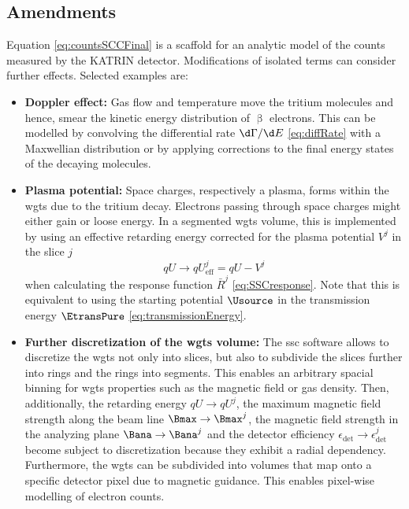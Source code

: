 \subsection{Amendments}
Equation \eqref{eq:countsSCCFinal} is a scaffold for an analytic model of the counts measured by the KATRIN detector. Modifications of isolated terms can consider further effects. Selected examples are:
\begin{itemize}
    \item \textbf{Doppler effect:} Gas flow and temperature move the tritium molecules and hence, smear the kinetic energy distribution of $\upbeta$ electrons. This can be modelled by convolving the differential rate $\d \Gamma / \d E$ \eqref{eq:diffRate} with a Maxwellian distribution or by applying corrections to the final energy states of the decaying molecules.
    \item \textbf{Plasma potential:} Space charges, respectively a plasma, forms within the \gls{wgts} due to the tritium decay. Electrons passing through space charges might either gain or loose energy. In a segmented \gls{wgts} volume, this is implemented by using an effective retarding energy corrected for the plasma potential $V^j$ in the slice $j$
    \begin{equation}
        qU \rightarrow qU^j_\mathrm{eff} = qU - V^j
    \end{equation} 
    when calculating the response function $\bar{R}^j$ \eqref{eq:SSCresponse}. Note that this is equivalent to using the starting potential $\Usource$ in the transmission energy $\EtransPure$ \eqref{eq:transmissionEnergy}.
    \item \textbf{Further discretization of the \gls{wgts} volume:} The \gls{ssc} software allows to discretize the \gls{wgts} not only into slices, but also to subdivide the slices further into rings and the rings into segments. This enables an arbitrary spacial binning for \gls{wgts} properties such as the magnetic field or gas density. Then, additionally, the retarding energy $qU \rightarrow qU^j$, the maximum magnetic field strength  along the beam line $\Bmax \rightarrow \Bmax^j$, the magnetic field strength in the analyzing plane $\Bana \rightarrow \Bana^j$ and the detector efficiency $\epsilon_\mathrm{det} \rightarrow \epsilon_\mathrm{det}^j$ become subject to discretization because they exhibit a radial dependency. Furthermore, the \gls{wgts} can be subdivided into volumes that map onto a specific detector pixel due to magnetic guidance. This enables pixel-wise modelling of electron counts.
\end{itemize}

